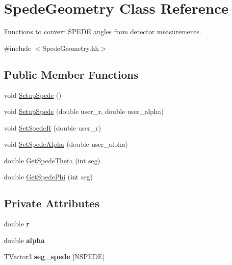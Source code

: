 \hypertarget{class_spede_geometry}{\section{Spede\-Geometry Class Reference}
\label{class_spede_geometry}
}


Functions to convert S\-P\-E\-D\-E angles from detector measurements.  




{\ttfamily \#include $<$Spede\-Geometry.\-hh$>$}

\subsection*{Public Member Functions}
\begin{DoxyCompactItemize}
\item 
void \hyperlink{class_spede_geometry_aff2cf68512c9a78eb117ff1ea44e95f0}{Setup\-Spede} ()
\item 
void \hyperlink{class_spede_geometry_ae79185d5c0e1d21a1a26ef824038ce9c}{Setup\-Spede} (double user\-\_\-r, double user\-\_\-alpha)
\item 
void \hyperlink{class_spede_geometry_ad17f4485ee83860a40082d8c8af5237c}{Set\-Spede\-R} (double user\-\_\-r)
\item 
void \hyperlink{class_spede_geometry_a94c3f5b2dbf4490db7d72514c8abe340}{Set\-Spede\-Alpha} (double user\-\_\-alpha)
\item 
double \hyperlink{class_spede_geometry_a05865b0752fb518337a9a16f8fba9085}{Get\-Spede\-Theta} (int seg)
\item 
double \hyperlink{class_spede_geometry_a93bd92636bce1259b189bb17275d238d}{Get\-Spede\-Phi} (int seg)
\end{DoxyCompactItemize}
\subsection*{Private Attributes}
\begin{DoxyCompactItemize}
\item 
\hypertarget{class_spede_geometry_a261e76a6451ed852aa0f86339bf8892d}{double {\bfseries r}}\label{class_spede_geometry_a261e76a6451ed852aa0f86339bf8892d}

\item 
\hypertarget{class_spede_geometry_a51d125e6521bb8e15a61b33fe938548f}{double {\bfseries alpha}}\label{class_spede_geometry_a51d125e6521bb8e15a61b33fe938548f}

\item 
\hypertarget{class_spede_geometry_ace763280532b3d4dd1d644e5f9380189}{T\-Vector3 {\bfseries seg\-\_\-spede} \mbox{[}N\-S\-P\-E\-D\-E\mbox{]}}\label{class_spede_geometry_ace763280532b3d4dd1d644e5f9380189}

\end{DoxyCompactItemize}


